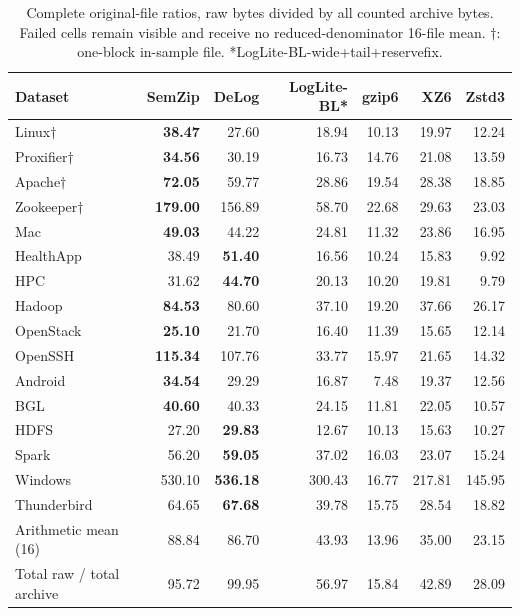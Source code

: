 \begin{table}[t]\centering\small
\caption{Complete original-file ratios, raw bytes divided by all counted archive bytes. Failed cells remain visible and receive no reduced-denominator 16-file mean. $\dagger$: one-block in-sample file. *LogLite-BL-wide+tail+reservefix.}
\label{tab:external-ratios}
\begin{tabular}{lrrrrrr}
\toprule
Dataset & SemZip & DeLog & LogLite-BL* & gzip6 & XZ6 & Zstd3 \\
\midrule
Linux$\dagger$ & \textbf{38.47} & 27.60 & 18.94 & 10.13 & 19.97 & 12.24 \\
Proxifier$\dagger$ & \textbf{34.56} & 30.19 & 16.73 & 14.76 & 21.08 & 13.59 \\
Apache$\dagger$ & \textbf{72.05} & 59.77 & 28.86 & 19.54 & 28.38 & 18.85 \\
Zookeeper$\dagger$ & \textbf{179.00} & 156.89 & 58.70 & 22.68 & 29.63 & 23.03 \\
Mac & \textbf{49.03} & 44.22 & 24.81 & 11.32 & 23.86 & 16.95 \\
HealthApp & 38.49 & \textbf{51.40} & 16.56 & 10.24 & 15.83 & 9.92 \\
HPC & 31.62 & \textbf{44.70} & 20.13 & 10.20 & 19.81 & 9.79 \\
Hadoop & \textbf{84.53} & 80.60 & 37.10 & 19.20 & 37.66 & 26.17 \\
OpenStack & \textbf{25.10} & 21.70 & 16.40 & 11.39 & 15.65 & 12.14 \\
OpenSSH & \textbf{115.34} & 107.76 & 33.77 & 15.97 & 21.65 & 14.32 \\
Android & \textbf{34.54} & 29.29 & 16.87 & 7.48 & 19.37 & 12.56 \\
BGL & \textbf{40.60} & 40.33 & 24.15 & 11.81 & 22.05 & 10.57 \\
HDFS & 27.20 & \textbf{29.83} & 12.67 & 10.13 & 15.63 & 10.27 \\
Spark & 56.20 & \textbf{59.05} & 37.02 & 16.03 & 23.07 & 15.24 \\
Windows & 530.10 & \textbf{536.18} & 300.43 & 16.77 & 217.81 & 145.95 \\
Thunderbird & 64.65 & \textbf{67.68} & 39.78 & 15.75 & 28.54 & 18.82 \\
Arithmetic mean (16) & 88.84 & 86.70 & 43.93 & 13.96 & 35.00 & 23.15 \\
Total raw / total archive & 95.72 & 99.95 & 56.97 & 15.84 & 42.89 & 28.09 \\
\bottomrule
\end{tabular}\end{table}
